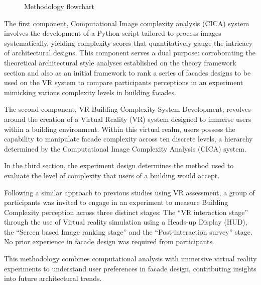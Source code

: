 \begin{figure}[!htb]
      \caption{Methodology flowchart}
      \label{fig:MethodologyFlowchart}
    \end{figure}

The first component, Computational Image complexity analysis (CICA) system involves the development of a Python script tailored to process images systematically, yielding complexity scores that quantitatively gauge the intricacy of architectural designs.
This component serves a dual purpose: corroborating the theoretical architectural style analyses established on the theory framework section and also as an initial framework to rank a series of facades designs to be used on the VR system to compare participants perceptions in an experiment mimicking various complexity levels in building facades.

The second component, VR Building Complexity System Development, revolves around the creation of a Virtual Reality (VR) system designed to immerse users within a building environment.
Within this virtual realm, users possess the capability to manipulate facade complexity across ten discrete levels, a hierarchy determined by the Computational Image Complexity Analysis (CICA) system.

In the third section, the experiment design determines the method used to evaluate the level of complexity that users of a building would accept.

Following a similar approach to previous studies using VR assessment\cite{Wolfartsberger2019}, a group of participants was invited to engage in an experiment to measure Building Complexity perception across three distinct stages: The ``VR interaction stage'' through the use of Virtual reality simulation using a Heads-up Display (HUD), the ``Screen based Image ranking stage'' and the ``Post-interaction survey'' stage.
No prior experience in facade design was required from participants.

This methodology combines computational analysis with immersive virtual reality experiments to understand user preferences in facade design, contributing insights into future architectural trends.


